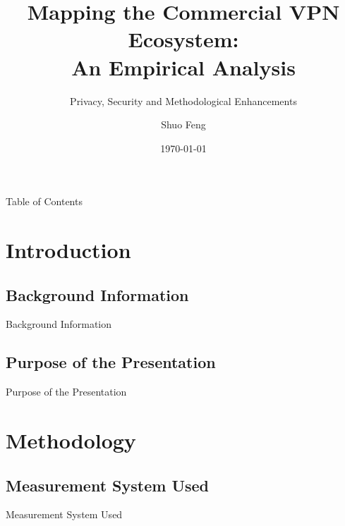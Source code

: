 \documentclass{beamer}
\title[Mapping the Commercial VPN Ecosystem]{
    Mapping the Commercial VPN Ecosystem:\\
    An Empirical Analysis
}
\subtitle[]{Privacy, Security and Methodological Enhancements}
\author[S. Feng]{Shuo Feng}
\institute[NIMS Lab]{NIMS Lab}
\date{\today}
\begin{document}
\frame{\titlepage}


\begin{frame}{Table of Contents}
  \tableofcontents
\end{frame}

\section{Introduction}

\subsection{Background Information}

\begin{frame}{Background Information}
\end{frame}

\subsection{Purpose of the Presentation}

\begin{frame}{Purpose of the Presentation}
\end{frame}

\section{Methodology}

\subsection{Measurement System Used}

\begin{frame}{Measurement System Used}
\end{frame}
\end{document}
